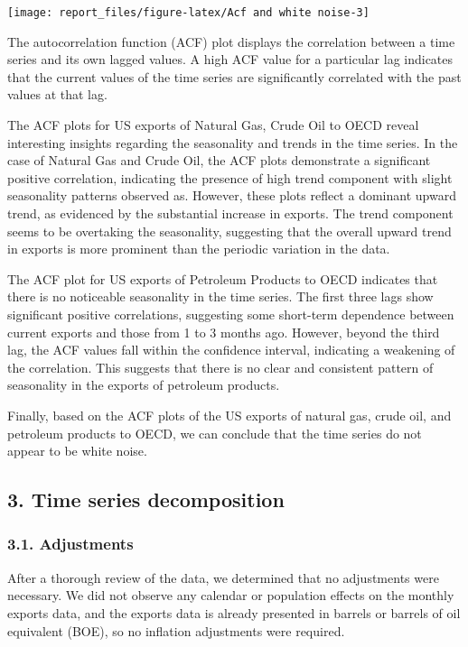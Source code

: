 \documentclass[
]{article}
\begin{document}
\begin{center}\texttt{[image: report\_files/figure-latex/Acf and white noise-3]} \end{center}

The autocorrelation function (ACF) plot displays the correlation between
a time series and its own lagged values. A high ACF value for a
particular lag indicates that the current values of the time series are
significantly correlated with the past values at that lag.

The ACF plots for US exports of Natural Gas, Crude Oil to OECD reveal
interesting insights regarding the seasonality and trends in the time
series. In the case of Natural Gas and Crude Oil, the ACF plots
demonstrate a significant positive correlation, indicating the presence
of high trend component with slight seasonality patterns observed as.
However, these plots reflect a dominant upward trend, as evidenced by
the substantial increase in exports. The trend component seems to be
overtaking the seasonality, suggesting that the overall upward trend in
exports is more prominent than the periodic variation in the data.

The ACF plot for US exports of Petroleum Products to OECD indicates that
there is no noticeable seasonality in the time series. The first three
lags show significant positive correlations, suggesting some short-term
dependence between current exports and those from 1 to 3 months ago.
However, beyond the third lag, the ACF values fall within the confidence
interval, indicating a weakening of the correlation. This suggests that
there is no clear and consistent pattern of seasonality in the exports
of petroleum products.

Finally, based on the ACF plots of the US exports of natural gas, crude
oil, and petroleum products to OECD, we can conclude that the time
series do not appear to be white noise.

\hypertarget{time-series-decomposition}{%
\subsection{3. Time series
decomposition}\label{time-series-decomposition}}

\hypertarget{adjustments}{%
\subsubsection{3.1. Adjustments}\label{adjustments}}

After a thorough review of the data, we determined that no adjustments
were necessary. We did not observe any calendar or population effects on
the monthly exports data, and the exports data is already presented in
barrels or barrels of oil equivalent (BOE), so no inflation adjustments
were required.
\end{document}
